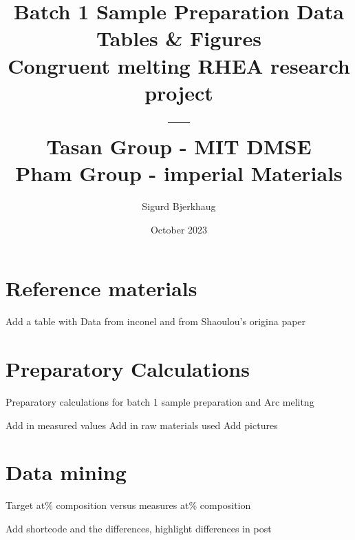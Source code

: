 \documentclass[a4]{article}
\title{Batch 1 Sample Preparation Data Tables \& Figures \\ Congruent melting RHEA research project \\ ---\\Tasan Group - MIT DMSE \\ Pham Group - imperial Materials \\}
\author{Sigurd Bjerkhaug}
\date{October 2023}
\begin{document}
\maketitle

\newpage




\section{Reference materials}
Add a table with Data from inconel and from Shaoulou's origina paper

\section{Preparatory Calculations}


\begin{table}[h]
    \centering
    \caption{Preparatory calculations for batch 1 sample preparation and Arc melitng}
    
    \label{tab:Batch1 preparation}
\end{table}
Add in measured values
Add in raw materials used
Add pictures

\newpage
\section{Data mining}

\begin{table}[h]
    \centering
    \caption{Target at\% composition versus measures at\% composition}
    
    \label{tab:Batch1 comparison}
\end{table}

Add shortcode and the differences, highlight differences in post
\end{document}
